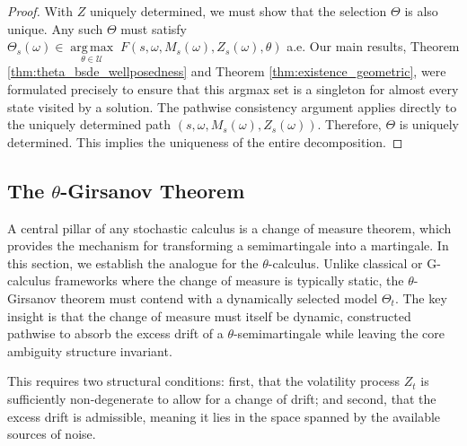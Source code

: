\documentclass[12pt, letterpaper]{amsart}
\newcommand{\Ucal}{\mathcal{U}}
\DeclareMathOperator*{\argmax}{arg\,max}
\theoremstyle{plain}
\theoremstyle{definition}
\theoremstyle{remark}
\numberwithin{equation}{section} %
\begin{document}
\begin{proof}
With \(Z\) uniquely determined, we must show that the selection \(\Theta\) is also unique. Any such \(\Theta\) must satisfy \(\Theta_s(\omega) \in \underset{\theta \in \Ucal}{\argmax} \; F(s, \omega, M_s(\omega), Z_s(\omega), \theta)\) a.e. Our main results, Theorem \ref{thm:theta_bsde_wellposedness} and Theorem \ref{thm:existence_geometric}, were formulated precisely to ensure that this argmax set is a singleton for almost every state visited by a solution. The pathwise consistency argument applies directly to the uniquely determined path \((s, \omega, M_s(\omega), Z_s(\omega))\). Therefore, \(\Theta\) is uniquely determined. This implies the uniqueness of the entire decomposition.
\end{proof}

\subsection{The \texorpdfstring{$\theta$}{theta}-Girsanov Theorem}
\label{subsec:theta_girsanov_theorem}

A central pillar of any stochastic calculus is a change of measure theorem, which provides the mechanism for transforming a semimartingale into a martingale. In this section, we establish the analogue for the \(\theta\)-calculus. Unlike classical or G-calculus frameworks where the change of measure is typically static, the \(\theta\)-Girsanov theorem must contend with a dynamically selected model \(\Theta_t\). The key insight is that the change of measure must itself be dynamic, constructed pathwise to absorb the excess drift of a \(\theta\)-semimartingale while leaving the core ambiguity structure invariant.

This requires two structural conditions: first, that the volatility process \(Z_t\) is sufficiently non-degenerate to allow for a change of drift; and second, that the excess drift is admissible, meaning it lies in the space spanned by the available sources of noise.
\end{document}
